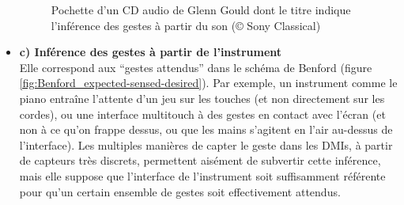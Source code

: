 \begin{itemize}[noitemsep]
	\begin{figure}[!htbp]
	\begin{flushright}
		\begin{minipage}[t]{0.93\linewidth}
			\captionsetup{format=plain}%
			\centering
			\caption[``The Sound of  Glenn Gould'', une inférence gestuelle]{Pochette d'un CD audio de Glenn Gould dont le titre indique l'inférence des gestes à partir du son (© Sony Classical)}
			\label{fig:gesture:Gould}
		\end{minipage}
	\end{flushright}
	\end{figure}

	\item \textbf{c) Inférence des gestes à partir de l'instrument}\\
	Elle correspond aux ``gestes attendus'' dans le schéma de Benford (figure \ref{fig:Benford_expected-sensed-desired}). Par exemple, un instrument comme le piano entraîne l'attente d'un jeu sur les touches (et non directement sur les cordes), ou une interface multitouch à des gestes en contact avec l'écran (et non à ce qu'on frappe dessus, ou que les mains s'agitent en l'air au-dessus de l'interface). Les multiples manières de capter le geste dans les \glspl{DMI}, à partir de capteurs très discrets, permettent aisément de subvertir cette inférence, mais elle suppose que l'interface de l'instrument soit suffisamment référente pour qu'un certain ensemble de gestes soit effectivement attendus.


\end{itemize}
